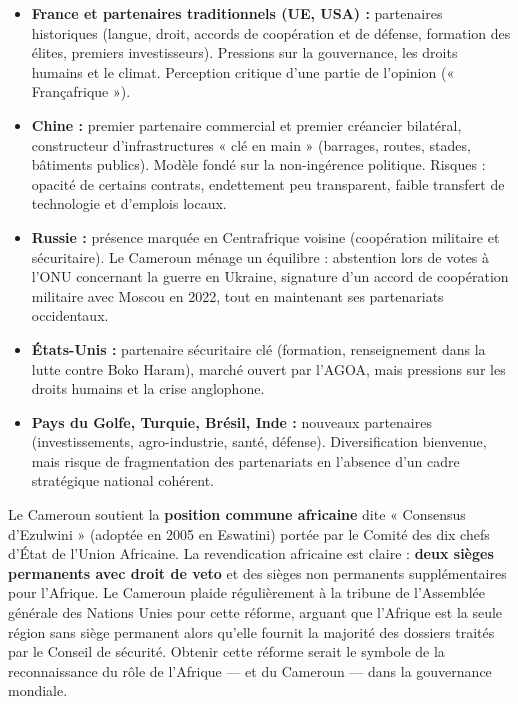 \documentclass[11pt]{article}
\begin{document}
\begin{itemize}
    \item \textbf{France et partenaires traditionnels (UE, USA) :} partenaires historiques (langue, droit, accords de coopération et de défense, formation des élites, premiers investisseurs). Pressions sur la gouvernance, les droits humains et le climat. Perception critique d'une partie de l'opinion (« Françafrique »).
    \item \textbf{Chine :} premier partenaire commercial et premier créancier bilatéral, constructeur d'infrastructures « clé en main » (barrages, routes, stades, bâtiments publics). Modèle fondé sur la non-ingérence politique. Risques : opacité de certains contrats, endettement peu transparent, faible transfert de technologie et d'emplois locaux.
    \item \textbf{Russie :} présence marquée en Centrafrique voisine (coopération militaire et sécuritaire). Le Cameroun ménage un équilibre : abstention lors de votes à l'ONU concernant la guerre en Ukraine, signature d'un accord de coopération militaire avec Moscou en 2022, tout en maintenant ses partenariats occidentaux.
    \item \textbf{États-Unis :} partenaire sécuritaire clé (formation, renseignement dans la lutte contre Boko Haram), marché ouvert par l'AGOA, mais pressions sur les droits humains et la crise anglophone.
    \item \textbf{Pays du Golfe, Turquie, Brésil, Inde :} nouveaux partenaires (investissements, agro-industrie, santé, défense). Diversification bienvenue, mais risque de fragmentation des partenariats en l'absence d'un cadre stratégique national cohérent.
\end{itemize}

\begin{savaistu}
Le Cameroun soutient la \textbf{position commune africaine} dite « Consensus d'Ezulwini » (adoptée en 2005 en Eswatini) portée par le Comité des dix chefs d'État de l'Union Africaine. La revendication africaine est claire : \textbf{deux sièges permanents avec droit de veto} et des sièges non permanents supplémentaires pour l'Afrique. Le Cameroun plaide régulièrement à la tribune de l'Assemblée générale des Nations Unies pour cette réforme, arguant que l'Afrique est la seule région sans siège permanent alors qu'elle fournit la majorité des dossiers traités par le Conseil de sécurité. Obtenir cette réforme serait le symbole de la reconnaissance du rôle de l'Afrique — et du Cameroun — dans la gouvernance mondiale.
\end{savaistu}
\end{document}
